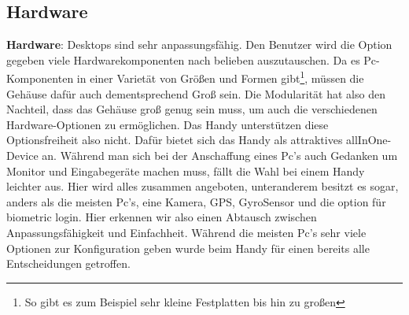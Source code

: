 \subsection{Hardware}

\myNewSection
\textbf{Hardware}: Desktops sind sehr anpassungsfähig. Den Benutzer wird die Option gegeben viele Hardwarekomponenten nach belieben auszutauschen. Da es Pc-Komponenten in einer Varietät von Größen und Formen gibt\footnote{So gibt es zum Beispiel sehr kleine Festplatten bis hin zu großen}, müssen die Gehäuse dafür auch dementsprechend Groß sein. \newline%
Die Modularität hat also den Nachteil, dass das Gehäuse groß genug sein muss, um auch die verschiedenen Hardware-Optionen zu ermöglichen. Das Handy unterstützen diese Optionsfreiheit also nicht. \newline%
Dafür bietet sich das Handy als attraktives allInOne-Device an. Während man sich bei der Anschaffung eines Pc's auch Gedanken um Monitor und Eingabegeräte machen muss, fällt die Wahl bei einem Handy leichter aus. Hier wird alles zusammen angeboten, unteranderem besitzt es sogar, anders als die meisten Pc's, eine Kamera, GPS, GyroSensor und die option für biometric login.\newline%
Hier erkennen wir also einen Abtausch zwischen Anpassungsfähigkeit und Einfachheit. Während die meisten Pc's sehr viele Optionen zur Konfiguration geben wurde beim Handy für einen bereits alle Entscheidungen getroffen.
